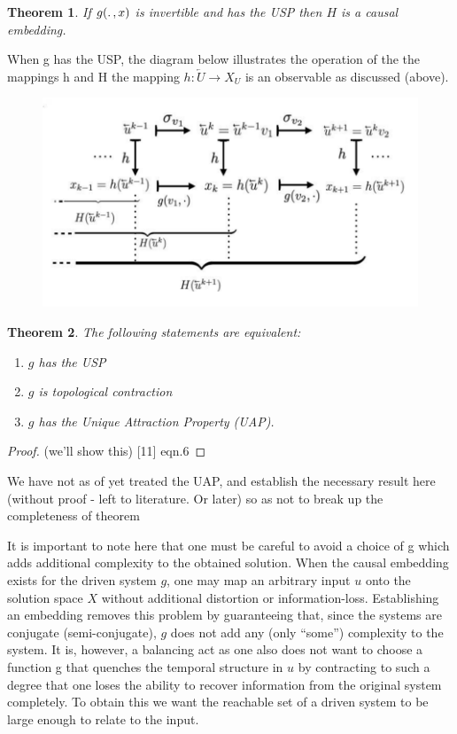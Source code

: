 \documentclass[12 pt]{article}
\newtheorem{Theorem}{Theorem}[]
\begin{document}
\begin{Theorem}
 If $g(\ldotp,x)$ is invertible and has the USP then $H$ is a causal embedding. 
\end{Theorem}

When g has the USP, the diagram below illustrates the operation of the the mappings h and H the mapping $h:\overleftarrow{U}\to{X_U}$ is an observable as discussed (above).  

\begin{figure}[ht]
  \includegraphics[scale=0.3]{actionofh_H.png}
  \centering
  \label{fig:actionh_H}
\end{figure}

\begin{Theorem}
  The following statements are equivalent:
  \vspace{-8mm}
  \begin{enumerate}[noitemsep, label=\roman*.]
    \item $g$ has the USP 
    \item $g$ is topological contraction 
    \item $g$ has the Unique Attraction Property (UAP). 
  \end{enumerate}
\end{Theorem}
\begin{proof}
  (we’ll show this)  [11] eqn.6 
\end{proof}

We have not as of yet treated the UAP, and establish the necessary result here (without proof - left to literature. Or later) so as not to break up the completeness of theorem 

It is important to note here that one must be careful to avoid a choice of g which adds additional complexity to the obtained solution.  
When the causal embedding exists for the driven system $g$, one may map an arbitrary input $u$ onto the solution space $X$ without additional distortion or information-loss.  
Establishing an embedding removes this problem by guaranteeing that, since the systems are conjugate (semi-conjugate), $g$ does not add any (only “some”) complexity to the system.  
It is, however, a balancing act as one also does not want to choose a function g that quenches the temporal structure in $u$ by contracting to such a degree that one loses the ability to recover information from the original system completely. To obtain this we want the reachable set of a driven system to be large enough to relate to the input.  
 
\end{document}

